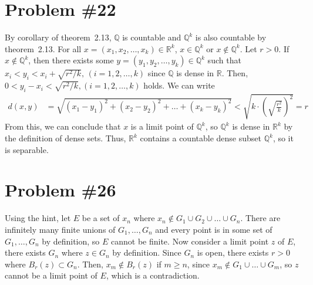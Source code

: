 \documentclass{scrartcl}
\begin{document}
\section{Problem \#22}
By corollary of theorem~2.13, \(\mathbb{Q}\) is countable and \(\mathbb{Q}^k\) is also countable by theorem~2.13.
For all \(x = (x_1, x_2, \dots, x_k) \in \mathbb{R}^k\), \(x \in \mathbb{Q}^k\) or \(x \not \in \mathbb{Q}^k\).
Let \(r > 0\).
If \(x \not \in \mathbb{Q}^k\), then there exists some \(y = (y_1, y_2, \dots, y_k) \in \mathbb{Q}^k\) such that \(x_i < y_i < x_i + \sqrt{r^2 / k},\, (i = 1, 2, \dots, k)\) since \(\mathbb{Q}\) is dense in \(\mathbb{R}\).
Then, \(0 < y_i - x_i < \sqrt{r^2 / k}, (i = 1, 2, \dots, k)\) holds.
We can write
\begin{align*}
  d(x, y) &= \sqrt{(x_1 - y_1)^2 + (x_2 - y_2)^2 + \dots + (x_k - y_k)^2} < \sqrt{k \cdot \left( \sqrt{\frac{r^2}{k}} \right)^2} = r
\end{align*}
From this, we can conclude that \(x\) is a limit point of \(\mathbb{Q}^k\), so \(\mathbb{Q}^k\) is dense in \(\mathbb{R}^k\) by the definition of dense sets.
Thus, \(\mathbb{R}^k\) contains a countable dense subset \(\mathbb{Q}^k\), so it is separable.

\section{Problem \#26}
Using the hint, let \(E\) be a set of \(x_n\) where \(x_n \not \in G_1 \cup G_2 \cup \dots \cup G_n\).
There are infinitely many finite unions of \(G_1, \dots, G_n\) and every point is in some set of \(G_1, \dots, G_n\) by definition, so \(E\) cannot be finite.
Now consider a limit point \(z\) of \(E\), there exists \(G_n\) where \(z \in G_n\) by definition.
Since \(G_n\) is open, there exists \(r > 0\) where \(B_r(z) \subset G_n\).
Then, \(x_m \not \in B_r(z)\) if \(m \geq n\), since \(x_m \not \in G_1 \cup \dots \cup G_m\), so \(z\) cannot be a limit point of \(E\), which is a contradiction.
\end{document}
